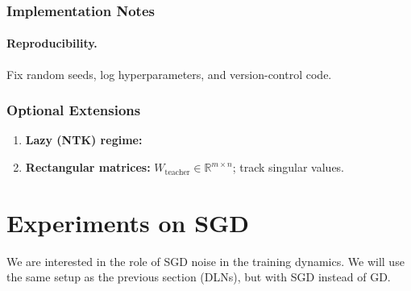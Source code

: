 \documentclass[11pt]{article}
\newcommand{\R}{\mathbb{R}}
\newcommand{\Wteacher}{\ensuremath{W_{\mathrm{teacher}}}}
\begin{document}
\subsubsection*{Implementation Notes}

\paragraph*{Reproducibility.}
Fix random seeds, log hyperparameters, and version-control code.

\subsubsection*{Optional Extensions}

\begin{enumerate}[label=\textbf{\Alph*.},leftmargin=*,nosep]
  \item \textbf{Lazy (NTK) regime:}
  \item \textbf{Rectangular matrices:} \(\Wteacher\in\R^{m\times n}\); track singular values.
\end{enumerate}

\section*{Experiments on SGD}
We are interested in the role of SGD noise in the training dynamics. We will use the same setup as the previous section (DLNs), but with SGD instead of GD. 
\end{document}
